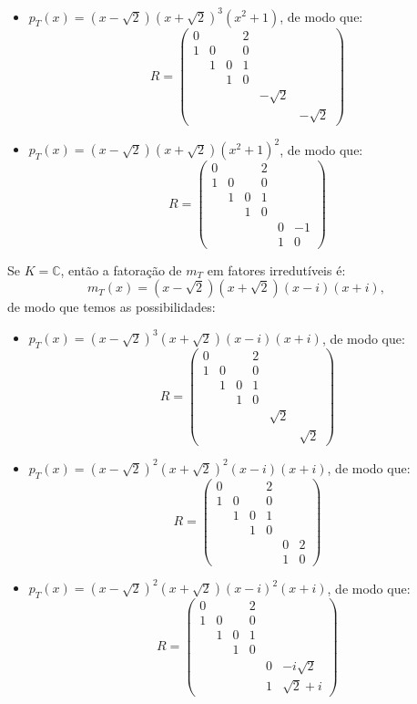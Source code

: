 \documentclass[11pt,a4paper]{article}
\begin{document}
{\begin{itemize}
\[\begin{pmatrix}
\end{pmatrix}
\]
\item $p_T(x)=(x-\sqrt{2})(x+\sqrt{2})^3(x^2+1)$, de modo que:
\[
R=\begin{pmatrix}
0&&&2&&\\1&0&&0&&\\&1&0&1&&\\&&1&0&&\\&&&&-\sqrt{2}&\\&&&&&-\sqrt{2}
\end{pmatrix}
\]
\item $p_T(x)=(x-\sqrt{2})(x+\sqrt{2})(x^2+1)^2$, de modo que:
\[
R=\begin{pmatrix}
0&&&2&&\\1&0&&0&&\\&1&0&1&&\\&&1&0&&\\&&&&0&-1\\&&&&1&0
\end{pmatrix}
\]
\end{itemize}
\dividiritens{
\task[\pers{c}]} Se $K=\mathbb{C}$, então a fatoração de $m_T$ em fatores irredutíveis é:
\[
m_T(x)=(x-\sqrt{2})(x+\sqrt{2})(x-i)(x+i),
\]
de modo que temos as possibilidades:
\begin{itemize}
\item $p_T(x)=(x-\sqrt{2})^3(x+\sqrt{2})(x-i)(x+i)$, de modo que:
\[
R=\begin{pmatrix}
0&&&2&&\\1&0&&0&&\\&1&0&1&&\\&&1&0&&\\&&&&\sqrt{2}&\\&&&&&\sqrt{2}
\end{pmatrix}
\]
\item $p_T(x)=(x-\sqrt{2})^2(x+\sqrt{2})^2(x-i)(x+i)$, de modo que:
\[
R=\begin{pmatrix}
0&&&2&&\\1&0&&0&&\\&1&0&1&&\\&&1&0&&\\&&&&0&2\\&&&&1&0
\end{pmatrix}
\]
\item $p_T(x)=(x-\sqrt{2})^2(x+\sqrt{2})(x-i)^2(x+i)$, de modo que:
\[
R=\begin{pmatrix}
0&&&2&&\\1&0&&0&&\\&1&0&1&&\\&&1&0&&\\&&&&0&-i\sqrt{2}\\&&&&1&\sqrt{2}+i

\end{pmatrix}\]
\end{itemize}}
\end{document}
